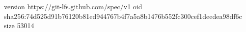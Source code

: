 version https://git-lfs.github.com/spec/v1
oid sha256:74d525d91b76120b81ed944767b4f7a5a8b1476b552fc300cef1deedea98df6c
size 53014
